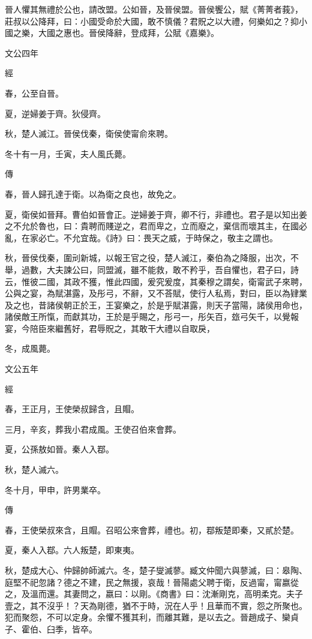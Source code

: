 \documentclass{ctexart}
\begin{document}
晉人懼其無禮於公也，請改盟。公如晉，及晉侯盟。晉侯饗公，賦《菁菁者莪》，莊叔以公降拜，曰：小國受命於大國，敢不慎儀？君貺之以大禮，何樂如之？抑小國之樂，大國之惠也。晉侯降辭，登成拜，公賦《嘉樂》。





文公四年


經



春，公至自晉。

夏，逆婦姜于齊。狄侵齊。

秋，楚人滅江。晉侯伐秦，衛侯使甯俞來聘。

冬十有一月，壬寅，夫人風氏薨。

傳



春，晉人歸孔達于衛。以為衛之良也，故免之。

夏，衛侯如晉拜。曹伯如晉會正。逆婦姜于齊，卿不行，非禮也。君子是以知出姜之不允於魯也，曰：貴聘而賤逆之，君而卑之，立而廢之，棄信而壞其主，在國必亂，在家必亡。不允宜哉。《詩》曰：畏天之威，于時保之，敬主之謂也。

秋，晉侯伐秦，圍刓新城，以報王官之役，楚人滅江，秦伯為之降服，出次，不舉，過數，大夫諫公曰，同盟滅，雖不能救，敢不矜乎，吾自懼也，君子曰，詩云，惟彼二國，其政不獲，惟此四國，爰究爰度，其秦穆之謂矣，衛甯武子來聘，公與之宴，為賦湛露，及彤弓，不辭，又不荅賦，使行人私焉，對曰，臣以為肄業及之也，昔諸侯朝正於王，王宴樂之，於是乎賦湛露，則天子當陽，諸侯用命也，諸侯敵王所愾，而獻其功，王於是乎賜之，彤弓一，彤矢百，玈弓矢千，以覺報宴，今陪臣來繼舊好，君辱貺之，其敢干大禮以自取戾，

冬，成風薨。





文公五年


經



春，王正月，王使榮叔歸含，且賵。

三月，辛亥，葬我小君成風。王使召伯來會葬。

夏，公孫敖如晉。秦人入鄀。

秋，楚人滅六。

冬十月，甲申，許男業卒。

傳



春，王使榮叔來含，且賵。召昭公來會葬，禮也。初，鄀叛楚即秦，又貳於楚。

夏，秦人入鄀。六人叛楚，即東夷。

秋，楚成大心、仲歸帥師滅六。冬，楚子燮滅蓼。臧文仲聞六與蓼滅，曰：皋陶、庭堅不祀忽諸？德之不建，民之無援，哀哉！晉陽處父聘于衛，反過甯，甯嬴從之，及溫而還。其妻問之，嬴曰：以剛。《商書》曰：沈漸剛克，高明柔克。夫子壹之，其不沒乎！？天為剛德，猶不于時，況在人乎！且華而不實，怨之所聚也。犯而聚怨，不可以定身。余懼不獲其利，而離其難，是以去之。晉趙成子、欒貞子、霍伯、臼季，皆卒。
\end{document}
